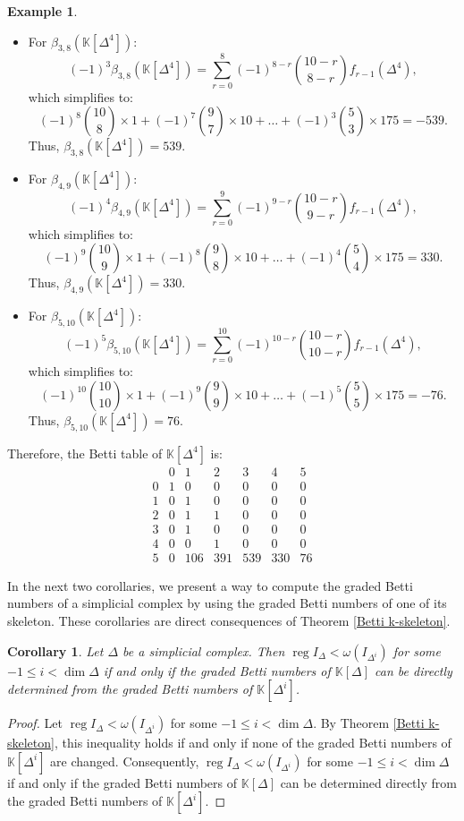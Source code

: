 \documentclass[a4paper,12pt]{amsart}
\numberwithin{equation}{section}
\newtheorem{corollary}[theorem]{Corollary}
\theoremstyle{definition}
\newtheorem{example}[theorem]{Example}
\newcommand{\K}[0]{\mathbb{K}}
\DeclareMathOperator{\reg}{reg}
\begin{document}
\begin{example}
\begin{itemize}
		\item For $\beta_{3,8}(\K[\Delta^4])$:
		$$(-1)^3\beta_{3,8}(\K[\Delta^4])=\sum_{r=0}^{8}(-1)^{8-r}\binom{10-r}{8-r}f_{r-1}(\Delta^4),$$
		which simplifies to:
		$$(-1)^8\binom{10}{8}\times1+(-1)^7\binom{9}{7}\times10+\dots+(-1)^3\binom{5}{3}\times175= -539.$$
		Thus, $\beta_{3,8}(\K[\Delta^4])=539$.
		
		\item For $\beta_{4,9}(\K[\Delta^4])$:
		$$(-1)^4\beta_{4,9}(\K[\Delta^4])=\sum_{r=0}^{9}(-1)^{9-r}\binom{10-r}{9-r} f_{r-1}(\Delta^4),$$
		which simplifies to:
		$$(-1)^9\binom{10}{9}\times1+(-1)^8\binom{9}{8}\times10+\dots+(-1)^4\binom{5}{4}\times175=330.$$
		Thus, $\beta_{4,9}(\K[\Delta^4])=330$.
		
		\item For $\beta_{5,10}(\K[\Delta^4])$:
		$$(-1)^5\beta_{5,10}(\K[\Delta^4])=\sum_{r=0}^{10}(-1)^{10-r}\binom{10-r}{10-r}f_{r-1}(\Delta^4),$$
		which simplifies to:
		$$(-1)^{10}\binom{10}{10}\times1+(-1)^9\binom{9}{9}\times10+\dots+(-1)^5\binom{5}{5}\times175=-76.$$
		Thus, $\beta_{5,10}(\K[\Delta^4])=76$.
	\end{itemize}
	Therefore, the Betti table of $\K[\Delta^4]$ is:
	$$\begin{array}{c|cccccc}
		& 0 & 1 & 2 & 3 & 4 & 5 \\
		\hline
		0 & 1 & 0 & 0 & 0 & 0 & 0 \\
		1 & 0 & 1 & 0 & 0 & 0 & 0 \\
		2 & 0 & 1 & 1 & 0 & 0 & 0 \\
		3 & 0 & 1 & 0 & 0 & 0 & 0 \\
		4 & 0 & 0 & 1 & 0 & 0 & 0 \\
		5 & 0 & 106 & 391 & 539 & 330 & 76
	\end{array}$$
\end{example}


In the next two corollaries, we present a way to compute the graded Betti numbers of a simplicial complex by using the graded Betti numbers of one of its skeleton. These corollaries are direct consequences of Theorem \ref{Betti k-skeleton}.

\begin{corollary}\label{Betti deg1}
	Let $\Delta$ be a simplicial complex. Then $\reg I_{\Delta}<\omega(I_{\Delta^i})$ for some $-1\le i<\dim\Delta$ if and only if the graded Betti numbers of $\K[\Delta]$ can be directly determined from the graded Betti numbers of $\K[\Delta^i]$.
\end{corollary}
\begin{proof}
	Let $\reg I_{\Delta}<\omega(I_{\Delta^i})$ for some $-1\leq i< \dim\Delta$. By Theorem \ref{Betti k-skeleton}, this inequality holds if and only if none of the graded Betti numbers of $\K[\Delta^i]$ are changed. Consequently, $\reg I_{\Delta}<\omega(I_{\Delta^i})$ for some $-1\leq i<\dim\Delta$ if and only if the graded Betti numbers of $\K[\Delta]$ can be determined directly from the graded Betti numbers of $\K[\Delta^i]$.
\end{proof}
\end{document}
